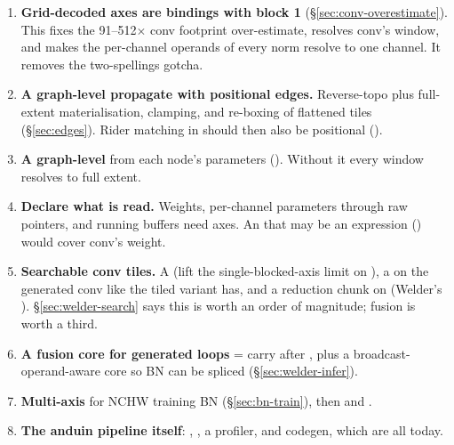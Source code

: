 \begin{enumerate}[leftmargin=1.4em,itemsep=0.35em]
\item \textbf{Grid-decoded axes are bindings with block 1} (\S\ref{sec:conv-overestimate}).
  This fixes the 91--512$\times$ conv footprint over-estimate, resolves conv's
   window, and makes the per-channel operands of every norm resolve to one
  channel. It removes the two-spellings gotcha.
\item \textbf{A graph-level propagate with positional edges.} Reverse-topo
   plus full-extent materialisation, clamping, and re-boxing of
  flattened tiles (\S\ref{sec:edges}). Rider matching in  should then
  also be positional ().
\item \textbf{A graph-level } from each node's parameters
  (). Without it every window resolves to full extent.
\item \textbf{Declare what is read.} Weights, per-channel parameters through raw
  pointers, and running buffers need axes. An  that may be an expression
  () would cover conv's weight.
\item \textbf{Searchable conv tiles.} A  (lift the single-blocked-axis
  limit on ), a  on the generated conv like the
  tiled variant has, and a reduction chunk on  (Welder's
  ). \S\ref{sec:welder-search} says this is worth an order of magnitude;
  fusion is worth a third.
\item \textbf{A fusion core for generated loops} = carry after , plus a
  broadcast-operand-aware core so BN can be spliced (\S\ref{sec:welder-infer}).
\item \textbf{Multi-axis } for NCHW training BN (\S\ref{sec:bn-train}),
  then  and .
\item \textbf{The anduin pipeline itself}: ,
  , a profiler, and codegen, which are all 
  today.
\end{enumerate}
